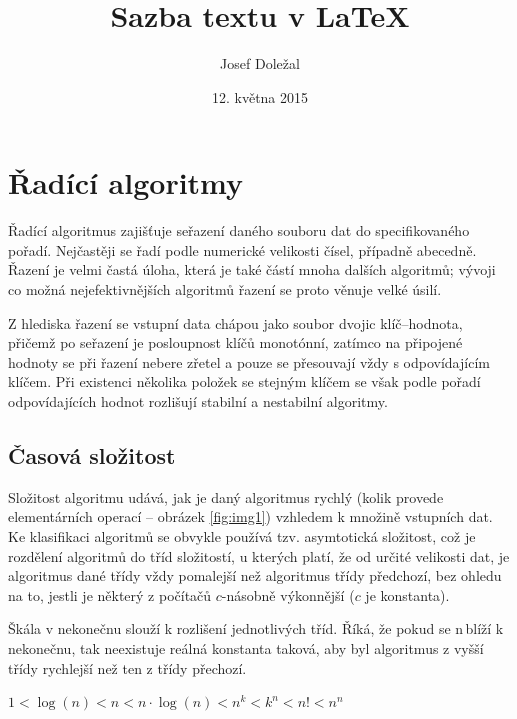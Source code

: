 \documentclass[a4paper,11pt]{article}
\title{Sazba textu v \LaTeX}
\author{Josef Doležal}
\date{12. května 2015}
\begin{document}
	\maketitle

	\section{Řadící algoritmy}

	Řadící algoritmus zajišťuje seřazení daného souboru dat do specifikovaného pořadí. Nejčastěji se řadí podle numerické velikosti čísel, případně abecedně. Řazení je velmi častá úloha, která je také částí mnoha dalších algoritmů; vývoji co možná nejefektivnějších algoritmů řazení se proto věnuje velké úsilí.
	
	Z hlediska řazení se vstupní data chápou jako soubor dvojic klíč--hodnota, přičemž po seřazení je posloupnost klíčů monotónní, zatímco na připojené hodnoty se při řazení nebere zřetel a pouze se přesouvají vždy s odpovídajícím klíčem. Při existenci několika položek se stejným klíčem se však podle pořadí odpovídajících hodnot rozlišují stabilní a nestabilní algoritmy.\cite{wiki}

	\subsection{Časová složitost}
	Složitost algoritmu udává, jak je daný algoritmus rychlý (kolik provede elementárních operací -- obrázek \ref{fig:img1}) vzhledem k množině vstupních dat. Ke klasifikaci algoritmů se obvykle používá tzv. asymtotická složitost, což je rozdělení algoritmů do tříd složitostí, u kterých platí, že od určité velikosti dat, je algoritmus dané třídy vždy pomalejší než algoritmus třídy předchozí, bez ohledu na to, jestli je některý z počítačů $c$-násobně výkonnější ($c$ je konstanta).

Škála v nekonečnu slouží k rozlišení jednotlivých tříd. Říká, že pokud se n\,blíží k nekonečnu, tak neexistuje reálná konstanta taková, aby byl algoritmus z vyšší třídy rychlejší než ten z třídy přechozí.\cite{algoritmy}
	
	$1<\log (n) < n < n \cdot \log (n) < n^k < k^n < n! < n^n$
	
\end{document}
